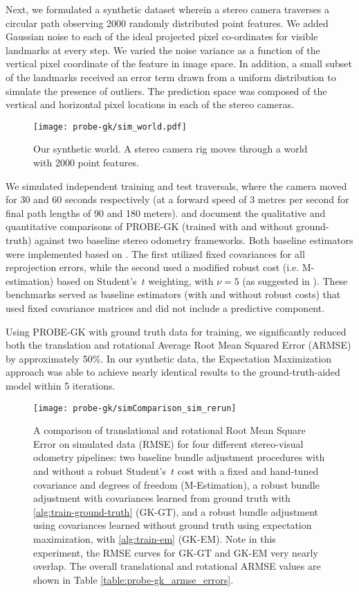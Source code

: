 Next, we formulated a synthetic dataset wherein a stereo camera traverses a circular path observing 2000 randomly distributed point features.
We added Gaussian noise to each of the ideal projected
pixel co-ordinates for visible landmarks at every step. We varied the noise variance as a function of the vertical pixel coordinate of
the feature in image space. In addition, a small subset of the landmarks received an error term drawn from a uniform distribution to simulate the presence of outliers. The prediction space was composed of
the vertical and horizontal pixel locations in each of the stereo cameras.

\begin{figure}
\centering
   \texttt{[image: probe-gk/sim\_world.pdf]}
   \label{fig:SimWorld} 
\caption{Our synthetic world. A stereo camera rig moves through a world with 2000 point features.}
\end{figure}

We simulated independent training and test traversals, where the camera moved for
30 and 60 seconds respectively (at a forward speed of 3 metres per second for final path
lengths of 90 and 180 meters).   and  document the qualitative and quantitative comparisons of PROBE-GK (trained with and without ground-truth) against two baseline stereo odometry frameworks. Both baseline estimators were implemented based on . The first utilized fixed covariances for all reprojection errors, while the second used a modified robust cost (i.e. M-estimation) based on Student's~$t$ weighting, with $\nu = 5$ (as suggested in \cite{kerl2013robust}).  These benchmarks served as baseline estimators (with and without robust costs) that used fixed covariance matrices and did not include a predictive component. 

Using PROBE-GK with ground truth data for training,
we significantly reduced both the translation and rotational Average Root Mean Squared Error (ARMSE)
by approximately 50\%. In our synthetic data, the Expectation Maximization approach was able to achieve nearly identical results to the ground-truth-aided model within 5 iterations.  

\begin{figure}
    \centering
    \texttt{[image: probe-gk/simComparison\_sim\_rerun]}
    \caption{A comparison of translational and rotational Root Mean Square Error on simulated data
    (RMSE) for four different stereo-visual odometry pipelines: two baseline
    bundle adjustment procedures with and without a robust Student's~$t$ cost with a fixed and
    hand-tuned covariance and degrees of freedom (M-Estimation), a robust bundle
    adjustment with covariances learned from ground truth with
    \cref{alg:train-ground-truth} (GK-GT), and a robust bundle adjustment using
    covariances learned without ground truth using expectation maximization,
    with \cref{alg:train-em} (GK-EM). Note in this experiment, the RMSE curves
    for GK-GT and GK-EM very nearly overlap. The overall translational and
    rotational ARMSE values are shown in Table \ref{table:probe-gk_armse_errors}.} 
    \label{fig:sim_comparison}
\end{figure}

